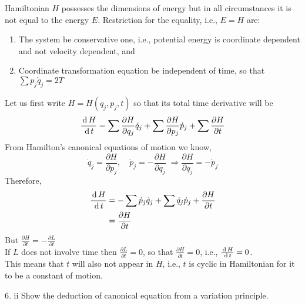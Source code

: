 \documentclass[12pt]{article}
\begin{document}
\begin{soln}
    Hamiltonian \(H\) possesses the dimensions of energy but in all circumstances it is not equal to the energy \(E\). Restriction for the equality, i.e., \(E=H\) are:
    \begin{enumerate}[label=(\roman*)]
        \item The system be conservative one, i.e., potential energy is coordinate dependent and not velocity dependent, and
        \item Coordinate transformation equation be independent of time,  so that \(\sum p_j\dot{q}_j=2T\) 
    \end{enumerate}
    Let us first write \(H=H(q_j,p_j,t)\) so that its total time derivative will be
    \[\frac{\,\mathrm{d}\, H}{\,\mathrm{d}\, t}=\sum \frac{\partial H}{\partial q_j}\dot{q}_j+\sum \frac{\partial H}{\partial p_j}\dot{p}_j+\sum \frac{\partial H}{\partial t}\]
    From Hamilton's canonical equations of motion we know,
    \[\dot{q}_j=\frac{\partial H}{\partial p_j},\quad\dot{p}_j=-\frac{\partial H}{\partial q_j}\;\Rightarrow\frac{\partial H}{\partial q_j}=-\dot{p}_j\]
    Therefore,
    \begin{align*}
        \frac{\,\mathrm{d}\, H}{\,\mathrm{d}\, t}&=-\sum \dot{p}_j\dot{q}_j+\sum \dot{q}_j\dot{p}_j+\frac{\partial H}{\partial t}\\
        &=\frac{\partial H}{\partial t}
    \end{align*}
    But \(\frac{\partial H}{\partial t}=-\frac{\partial L}{\partial t}\)\\
    If \(L\) does not involve time then \(\frac{\partial L}{\partial t}=0\), so that \(\frac{\partial H}{\partial t}=0\), i.e., \(\frac{\,\mathrm{d}\, H}{\,\mathrm{d}\, t}=0\).\\
    This means that \(t\) will also not appear in \(H\), i.e., \(t\) is cyclic in Hamiltonian for it to be a constant of motion.
\end{soln}
\begin{prob}{6. ii}
    Show the deduction of canonical equation from a variation principle.
\end{prob}
\end{document}
